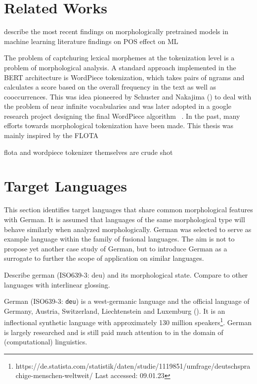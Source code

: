 \section{Related Works}
\label{sec:related-works}

describe the most recent findings on morphologically pretrained models in machine learning literature
findings on POS effect on ML

The problem of captchuring lexical morphemes at the tokenization level is a problem of morphological analysis.
A standard approach implemented in the BERT architecture is WordPiece tokenization, which takes pairs of ngrams and calculates a score based on the overall frequency in the text as well as cooccurrences.
This was idea pioneered by Schuster and Nakajima (\citeyear{WORDPIECEOG}) to deal with the problem of near infinite vocabularies and was later adopted in a google research project designing the final WordPiece algorithm ~\cite{WORDPIECEGOOGLE}.
In the past, many efforts towards morphological tokenization have been made.
This thesis was mainly inspired by the FLOTA

flota and wordpiece tokenizer themselves are crude shot


\section{Target Languages}
\label{sec:target-languages}
This section identifies target languages that share common morphological features with German.
It is assumed that languages of the same morphological type will behave similarly when analyzed morphologically.
German was selected to serve as example language within the family of fusional languages.
The aim is not to propose yet another case study of German, but to introduce German as a surrogate to further the scope of application on similar languages.

Describe german (ISO639-3: deu) and its morphological state. Compare to other languages with interlinear glossing.


German (ISO639-3: \texttt{deu}) is a west-germanic language and the official language of Germany, Austria, Switzerland, Liechtenstein and Luxemburg (\cite{METZLER2016}).
It is an inflectional synthetic language with approximately 130 million speakers\footnote{https://de.statista.com/statistik/daten/studie/1119851/umfrage/deutschsprachige-menschen-weltweit/ Last accessed: 09.01.23}.
German is largely researched and is still paid much attention to in the domain of (computational) linguistics.


